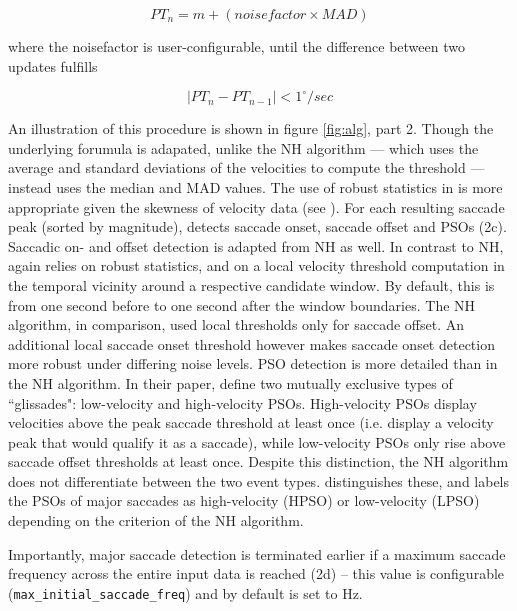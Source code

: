  $$PT_n = m + (noisefactor \times MAD)$$
 
 where the noisefactor is user-configurable, until the difference between two updates fulfills
 
 $$|PT_n - PT_{n-1}| < 1^\circ/sec$$
 
 An illustration of this procedure is shown in figure \ref{fig:alg}, part 2. Though the underlying forumula is adapated, unlike the NH algorithm --- which uses the average and standard deviations of the velocities to compute the threshold --- \remodnav instead uses the median and MAD values. The use of robust statistics in \remodnav is more appropriate given the skewness of velocity data (see \cite{Friedman2018}). For each resulting saccade peak (sorted by magnitude), \remodnav detects saccade onset, saccade offset and PSOs (2c). Saccadic on- and offset detection is adapted from NH as well. In contrast to NH, \remodnav again relies on robust statistics, and on a local velocity threshold computation in the temporal vicinity around a respective candidate window. By default, this is from one second before to one second after the window boundaries. The NH algorithm, in comparison, used local thresholds only for saccade offset. An additional local saccade onset threshold however makes saccade onset detection more robust under differing noise levels.  PSO detection is more detailed than in the NH algorithm. In their paper, \cite{Nystrom2010AnData} define two mutually exclusive types of ``glissades": low-velocity and high-velocity PSOs. High-velocity PSOs display velocities above the peak saccade threshold at least once (i.e. display a velocity peak that would qualify it as a saccade), while low-velocity PSOs only rise above saccade offset thresholds at least once. Despite this distinction, the NH algorithm does not differentiate between the two event types. \remodnav distinguishes these, and labels the PSOs of major saccades as high-velocity (HPSO) or low-velocity (LPSO) depending on the criterion of the NH algorithm.
 
 Importantly, major saccade detection is terminated earlier if a maximum saccade frequency across the entire input data is reached (2d) -- this value is configurable (\texttt{max\_initial\_saccade\_freq}) and by default is set to \unit[2]{Hz}. 
 

